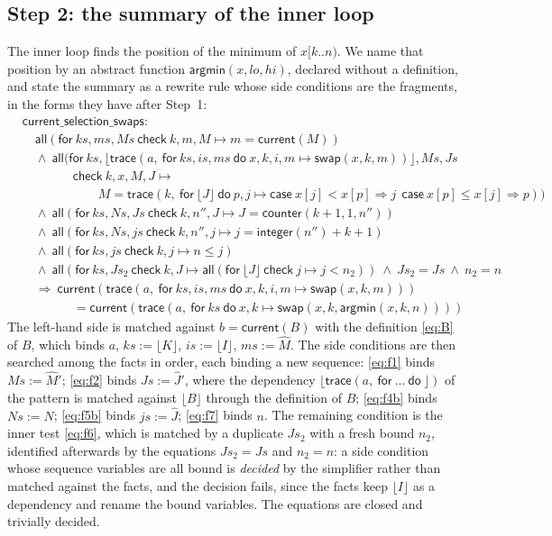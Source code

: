 \documentclass[11pt,a4paper]{article}
\newcommand{\bl}[1]{\lfloor #1\rfloor}                       %
\newcommand{\tr}[3]{\mathsf{trace}(#1,\ \mathsf{for}\ #2\ \mathsf{do}\ #3)}
\newcommand{\al}[2]{\mathsf{all}(\mathsf{for}\ #1\ \mathsf{check}\ #2)}
\newcommand{\cnt}{\mathsf{counter}}
\newcommand{\cur}{\mathsf{current}}
\newcommand{\intf}{\mathsf{integer}}
\newcommand{\argmin}{\mathsf{argmin}}
\newcommand{\swap}[3]{\mathsf{swap}(#1, #2, #3)}
\newcommand{\upd}[2]{\mathsf{case}\ #1 \Rightarrow #2}
\newcommand{\lemma}[1]{\textsf{#1}}
\newcommand{\seq}[1]{\hat{#1}}                               %
\begin{document}
\subsection{Step 2: the summary of the inner loop}\label{sec:sel:sum}

The inner loop finds the position of the minimum of $x[k..n)$. We name that position by an abstract
function $\argmin(x, lo, hi)$, declared without a definition, and state the summary as a rewrite rule
whose side conditions are the fragments, in the forms they have after Step~1:
\begin{align*}
  &\lemma{current\_selection\_swaps}:\\
  &\quad \al{ks, ms, Ms}{k, m, M \mapsto m = \cur(M)} \\
  &\quad\wedge\ \mathsf{all}(\mathsf{for}\ ks, \bl{\tr{a}{ks, is, ms}{x, k, i, m \mapsto \swap{x}{k}{m}}}, Ms, Js\\
  &\qquad\qquad \mathsf{check}\ k, x, M, J \mapsto {}\\
  &\qquad\qquad\qquad M = \tr{k}{\bl{J}}{p, j \mapsto \upd{x[j] < x[p]}{j}\ \ \upd{x[p] \le x[j]}{p}}) \\
  &\quad\wedge\ \al{ks, Ns, Js}{k, n'', J \mapsto J = \cnt(k + 1, 1, n'')} \\
  &\quad\wedge\ \al{ks, Ns, js}{k, n'', j \mapsto j = \intf(n'') + k + 1}\\
  &\quad\wedge\ \al{ks, js}{k, j \mapsto n \le j} \\
  &\quad\wedge\ \al{ks, Js_2}{k, J \mapsto \al{\bl{J}}{j \mapsto j < n_2}}\ \wedge\ Js_2 = Js\ \wedge\ n_2 = n \\
  &\quad\Longrightarrow\ \cur(\tr{a}{ks, is, ms}{x, k, i, m \mapsto \swap{x}{k}{m}})\\
  &\qquad\qquad = \cur(\tr{a}{ks}{x, k \mapsto \swap{x}{k}{\argmin(x, k, n)}})
\end{align*}
The left-hand side is matched against $b = \cur(B)$ with the definition \eqref{eq:B} of $B$, which binds
$a$, $ks := \bl{K}$, $is := \bl{I}$, $ms := \seq{M}$. The side conditions are then searched among the
facts in order, each binding a new sequence: \eqref{eq:f1} binds $Ms := \seq{M}'$; \eqref{eq:f2} binds
$Js := \seq{J}'$, where the dependency $\bl{\tr{a}{\ldots}}$ of the pattern is matched against $\bl{B}$
through the definition of $B$; \eqref{eq:f4b} binds $Ns := \seq{N}$; \eqref{eq:f5b} binds $js := \seq{J}$;
\eqref{eq:f7} binds $n$. The remaining condition is the inner test \eqref{eq:f6}, which is matched by a
duplicate $Js_2$ with a fresh bound $n_2$, identified afterwards by the equations $Js_2 = Js$ and $n_2 = n$:
a side condition whose sequence variables are all bound is \emph{decided} by the simplifier rather than
matched against the facts, and the decision fails, since the facts keep $\bl{I}$ as a dependency and
rename the bound variables. The equations are closed and trivially decided.
\end{document}
